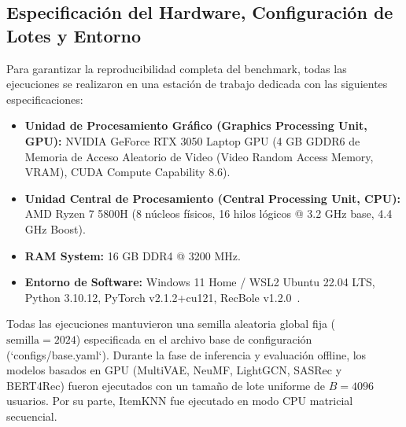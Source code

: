 \documentclass[journal]{IEEEtran}
\begin{document}
\subsection{Especificación del Hardware, Configuración de Lotes y Entorno}
Para garantizar la reproducibilidad completa del benchmark, todas las ejecuciones se realizaron en una estación de trabajo dedicada con las siguientes especificaciones:
\begin{itemize}
    \item \textbf{Unidad de Procesamiento Gráfico (Graphics Processing Unit, GPU):} NVIDIA GeForce RTX 3050 Laptop GPU (4 GB GDDR6 de Memoria de Acceso Aleatorio de Video (Video Random Access Memory, VRAM), CUDA Compute Capability 8.6).
    \item \textbf{Unidad Central de Procesamiento (Central Processing Unit, CPU):} AMD Ryzen 7 5800H (8 núcleos físicos, 16 hilos lógicos @ 3.2 GHz base, 4.4 GHz Boost).
    \item \textbf{RAM System:} 16 GB DDR4 @ 3200 MHz.
    \item \textbf{Entorno de Software:} Windows 11 Home / WSL2 Ubuntu 22.04 LTS, Python 3.10.12, PyTorch v2.1.2+cu121, RecBole v1.2.0~\cite{zhao2021recbole}.
\end{itemize}

Todas las ejecuciones mantuvieron una semilla aleatoria global fija ($\text{semilla} = 2024$) especificada en el archivo base de configuración (`configs/base.yaml`). Durante la fase de inferencia y evaluación offline, los modelos basados en GPU (MultiVAE, NeuMF, LightGCN, SASRec y BERT4Rec) fueron ejecutados con un tamaño de lote uniforme de $B=4096$ usuarios. Por su parte, ItemKNN fue ejecutado en modo CPU matricial secuencial.
\end{document}
